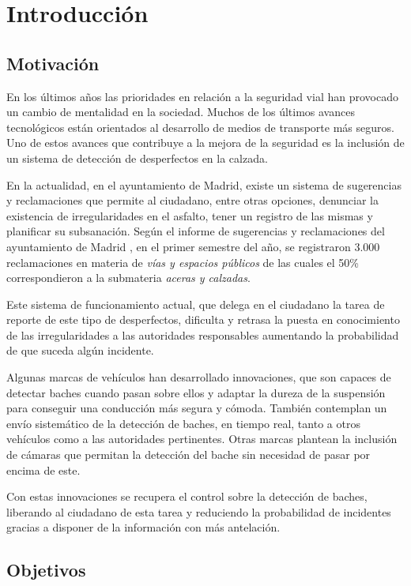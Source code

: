 \section{Introducción}

\subsection{Motivación}

En los últimos años las prioridades en relación a la seguridad vial han provocado un cambio de mentalidad en la sociedad.  Muchos de los últimos avances tecnológicos están orientados al desarrollo de medios de transporte más seguros. Uno de estos avances que contribuye a la mejora de la seguridad es la inclusión de un sistema de detección de desperfectos en la calzada.

En la actualidad, en el ayuntamiento de Madrid, existe un sistema de sugerencias y reclamaciones \cite{s1_syr} que permite al ciudadano, entre otras opciones, denunciar la existencia de irregularidades en el asfalto, tener un registro de las mismas y planificar su subsanación. Según el informe de sugerencias y reclamaciones del ayuntamiento de Madrid \cite{s1_syrreport}, en el primer semestre del año, se registraron 3.000 reclamaciones en materia de \textit{vías y espacios públicos} de las cuales el 50\% correspondieron a la submateria \textit{aceras y calzadas}.

Este sistema de funcionamiento actual, que delega en el ciudadano la tarea de reporte de este tipo de desperfectos, dificulta y retrasa la puesta en conocimiento de las irregularidades a las autoridades responsables aumentando la probabilidad de que suceda algún incidente.

Algunas marcas de vehículos han desarrollado innovaciones, que son capaces de detectar baches cuando pasan sobre ellos y adaptar la dureza de la suspensión para conseguir una conducción más segura y cómoda. También contemplan un envío sistemático de la detección de baches, en tiempo real, tanto a otros vehículos como a las autoridades pertinentes. Otras marcas plantean la inclusión de cámaras que permitan la detección del bache sin necesidad de pasar por encima de este.

Con estas innovaciones se recupera el control sobre la detección de baches, liberando al ciudadano de esta tarea y reduciendo la probabilidad de incidentes gracias a disponer de la información con más antelación.

\subsection{Objetivos}

